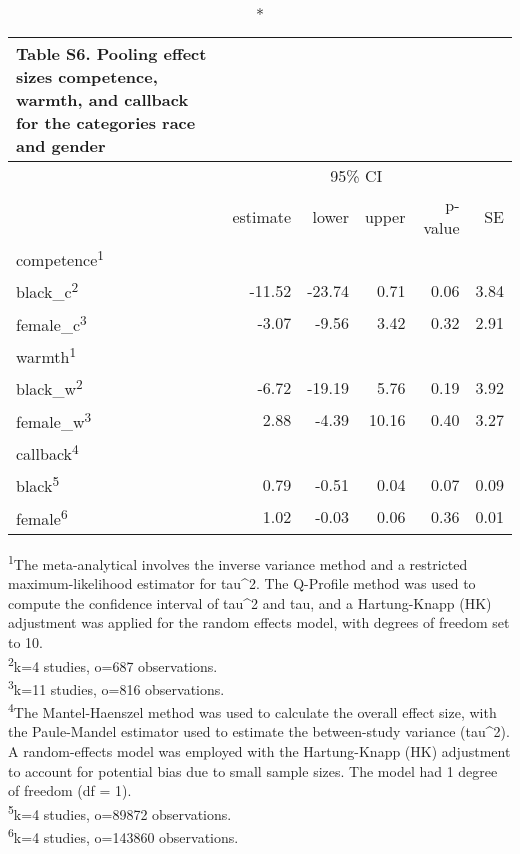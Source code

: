 \setlength{\LTpost}{0mm}
\begin{longtable}{l|rrrrr}
\caption*{
{\large Table S6. Pooling effect sizes competence, warmth, and callback for the categories race and gender}
} \\ 
\toprule
\multicolumn{1}{l}{} &  & \multicolumn{2}{c}{95\% CI} &  &  \\ 
\cmidrule(lr){3-4}
\multicolumn{1}{l}{} & estimate & lower & upper & p-value & SE \\ 
\midrule
\multicolumn{6}{l}{competence\textsuperscript{1}} \\ 
\midrule
black\_c\textsuperscript{2} & -11.52 & -23.74 & 0.71 & 0.06 & 3.84 \\ 
female\_c\textsuperscript{3} & -3.07 & -9.56 & 3.42 & 0.32 & 2.91 \\ 
\midrule
\multicolumn{6}{l}{warmth\textsuperscript{1}} \\ 
\midrule
black\_w\textsuperscript{2} & -6.72 & -19.19 & 5.76 & 0.19 & 3.92 \\ 
female\_w\textsuperscript{3} & 2.88 & -4.39 & 10.16 & 0.40 & 3.27 \\ 
\midrule
\multicolumn{6}{l}{callback\textsuperscript{4}} \\ 
\midrule
black\textsuperscript{5} & 0.79 & -0.51 & 0.04 & 0.07 & 0.09 \\ 
female\textsuperscript{6} & 1.02 & -0.03 & 0.06 & 0.36 & 0.01 \\ 
\bottomrule
\end{longtable}
\begin{minipage}{\linewidth}
\textsuperscript{1}The meta-analytical involves the inverse variance method and a restricted maximum-likelihood estimator for tau\textasciicircum{}2. The Q-Profile method was used to compute the confidence interval of tau\textasciicircum{}2 and tau, and a Hartung-Knapp (HK) adjustment was applied for the random effects model, with degrees of freedom set to 10.\\
\textsuperscript{2}k=4 studies, o=687 observations.\\
\textsuperscript{3}k=11 studies, o=816 observations.\\
\textsuperscript{4}The Mantel-Haenszel method was used to calculate the overall effect size, with the Paule-Mandel estimator used to estimate the between-study variance (tau\textasciicircum{}2). A random-effects model was employed with the Hartung-Knapp (HK) adjustment to account for potential bias due to small sample sizes. The model had 1 degree of freedom (df = 1).\\
\textsuperscript{5}k=4 studies, o=89872 observations.\\
\textsuperscript{6}k=4 studies, o=143860 observations.\\
\end{minipage}

